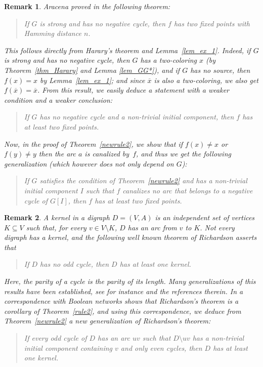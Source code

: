 \documentclass[11pt,a4paper]{article}
\newtheorem{remark}{Remark}
\begin{document}
\begin{remark}
{\em Aracena proved in \cite{A08} the following theorem: 
\begin{quote}
{\em If $G$ is strong and has no negative cycle, then $f$ has two fixed points with Hamming distance $n$.
} 
\end{quote}
This follows directly from Harary's theorem and Lemma~\ref{lem_ex_1}. Indeed, if $G$ is strong and has no negative cycle, then $G$ has a two-coloring $x$ (by Theorem~\ref{thm_Harary} and Lemma \ref{lem_GG*}), and if $G$ has no source, then $f(x)=x$ by Lemma~\ref{lem_ex_1}; and since $\overline{x}$ is also a two-coloring, we also get $f(\overline{x})=\overline{x}$. From this result, we easily deduce a statement with a weaker condition and a weaker conclusion: 
\begin{quote}
{\em If $G$ has no negative cycle and a non-trivial initial component, then $f$ has at least two fixed points}. 
\end{quote}
Now, in the proof of Theorem~\ref{newrule2}, we show that if $f(x)\neq x$ or $f(y)\neq y$ then the arc $a$ is canalized by~$f$, and thus we get the following generalization (which however does not only depend on $G$):} 
\begin{quote}
If $G$ satisfies the condition of Theorem~\ref{newrule2} and has a non-trivial initial component $I$ such that $f$ canalizes no arc that belongs to a negative cycle of $G[I]$, then $f$ has at least two fixed points.
\end{quote}
\end{remark}

\begin{remark}
{\em A {\em kernel} in a digraph $D=(V,A)$ is an independent set of vertices $K\subseteq V$ such that, for every $v\in V\setminus K$, $D$ has an arc from $v$ to $K$. Not every digraph has a kernel, and the following well known theorem of Richardson \cite{R53} asserts that 
\begin{quote}
{\em If $D$ has no odd cycle, then $D$ has at least one kernel}. 
\end{quote}
Here, the parity of a cycle is the parity of its length. Many generalizations of this results have been established, see for instance \cite{GSNL84,GSLS15} and the references therein. In \cite{RR13} a correspondence with Boolean networks shows that Richardson's theorem is a corollary of Theorem~\ref{rule2}, and using this correspondence, we deduce from Theorem~\ref{newrule2} a new generalization of Richardson's theorem:}
\begin{quote}
If every odd cycle of $D$ has an arc $uv$ such that $D\setminus uv$ has a non-trivial initial component containing $v$ and only even cycles, then $D$ has at least one kernel.
\end{quote}
\end{remark}
\end{document}
